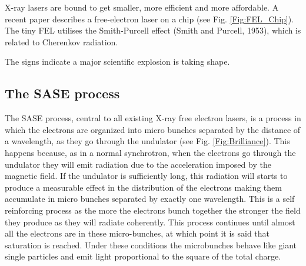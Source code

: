 X-ray lasers are bound to get smaller, more efficient and more affordable. A
recent paper describes a free-electron laser on a chip
(see Fig. \ref{Fig:FEL_Chip}). The tiny FEL utilises the Smith-Purcell effect (Smith and
Purcell, 1953), which is related to Cherenkov radiation.
 
The signs indicate a major scientific explosion is taking shape.
 



\subsection{The SASE process}

The SASE process, central to all existing X-ray free electron lasers, is a
process in which the electrons are organized into micro bunches separated by the
distance of a wavelength, as they go through the undulator (see
Fig. \ref{Fig:Brilliance}). This happens because,
as in a normal synchrotron, when the electrons go through the undulator they
will emit radiation due to the acceleration imposed by the magnetic field. If
the undulator is sufficiently long, this radiation will starts to produce a
measurable effect in the distribution of the electrons making them accumulate in
micro bunches separated by exactly one wavelength. This is a self reinforcing
process as the more the electrons bunch together the stronger the field they
produce as they will radiate coherently. This process continues until almost all
the electrons are in these micro-bunches, at which point it is said that
saturation is reached. Under these conditions the microbunches behave like giant
single particles and emit light proportional to the square of the total charge.

